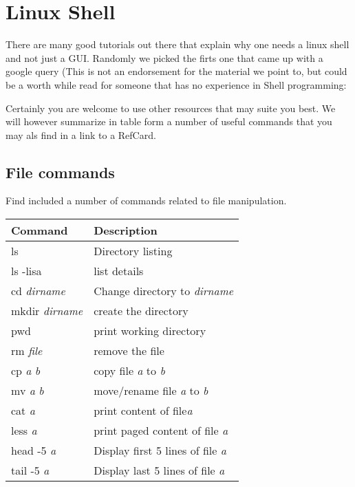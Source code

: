 \FILENAME

\chapter{Linux Shell}
\label{C:linux-shell}

There are many good tutorials out there that explain why one needs a
linux shell and not just a GUI. Randomly we picked the firts one that
came up with a google query (This is not an endorsement for the material
we point to, but could be a worth while read for someone that has no
experience in Shell programming:


Certainly you are welcome to use other resources that may suite you
best. We will however summarize in table form a number of useful
commands that you may als find in a link to a RefCard.



\section{File commands}\label{file-commands}

Find included a number of commands related to file manipulation.

\begin{tabular}{ll}
Command & Description \\
\hline
ls & Directory listing\\
ls -lisa & list details \\
cd \emph{dirname} & Change directory to \emph{dirname} \\
mkdir \emph{dirname} & create the directory \\
pwd & print working directory \\
rm \emph{file} & remove the file \\
cp \emph{a} \emph{b} & copy file \emph{a} to \emph{b} \\
mv \emph{a} \emph{b} & move/rename file \emph{a} to \emph{b}\\
cat \emph{a} & print content of file\emph{a}\\
less \emph{a} & print paged content of file \emph{a}\\
head -5 \emph{a} & Display first 5 lines of file \emph{a}\\
tail -5 \emph{a} & Display last 5 lines of file \emph{a}
\end{tabular}

